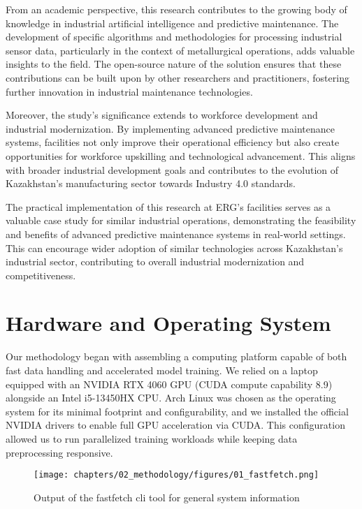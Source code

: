 From an academic perspective, this research contributes to the growing body of knowledge in industrial artificial intelligence and predictive maintenance. The development of specific algorithms and methodologies for processing industrial sensor data, particularly in the context of metallurgical operations, adds valuable insights to the field. The open-source nature of the solution ensures that these contributions can be built upon by other researchers and practitioners, fostering further innovation in industrial maintenance technologies.

Moreover, the study's significance extends to workforce development and industrial modernization. By implementing advanced predictive maintenance systems, facilities not only improve their operational efficiency but also create opportunities for workforce upskilling and technological advancement. This aligns with broader industrial development goals and contributes to the evolution of Kazakhstan's manufacturing sector towards Industry 4.0 standards.

The practical implementation of this research at ERG's facilities serves as a valuable case study for similar industrial operations, demonstrating the feasibility and benefits of advanced predictive maintenance systems in real-world settings. This can encourage wider adoption of similar technologies across Kazakhstan's industrial sector, contributing to overall industrial modernization and competitiveness.

\section{Hardware and Operating System}

Our methodology began with assembling a computing platform capable of both fast data handling and accelerated model training. We relied on a laptop equipped with an NVIDIA RTX 4060 GPU (CUDA compute capability 8.9) alongside an Intel i5-13450HX CPU. Arch Linux was chosen as the operating system for its minimal footprint and configurability, and we installed the official NVIDIA drivers to enable full GPU acceleration via CUDA. This configuration allowed us to run parallelized training workloads while keeping data preprocessing responsive.

\begin{figure}[H]
    \centering
    \texttt{[image: chapters/02\_methodology/figures/01\_fastfetch.png]}
    \caption{Output of the fastfetch cli tool for general system information}
\end{figure}


